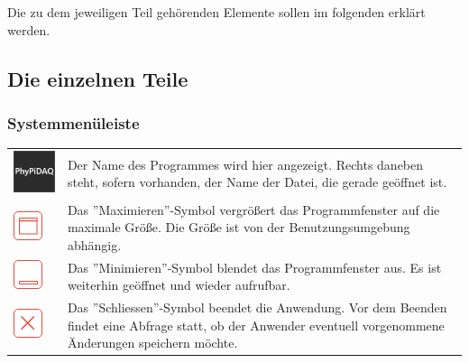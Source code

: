 \documentclass[parskip=full]{scrartcl}
\begin{document}
Die zu dem jeweiligen Teil gehörenden Elemente sollen im folgenden erklärt werden.

\subsection{Die einzelnen Teile}

\subsubsection{Systemmenüleiste}

\begin{tabular}[t]{p{1cm} p{10cm}}
	\vspace{0cm}\includegraphics[width = 1 cm]{Grafik/PhyPiDAQ.png} & Der Name des Programmes wird hier angezeigt. Rechts daneben steht, sofern vorhanden, der Name der Datei, die gerade geöffnet ist.\newline\\
	\vspace{0cm}\includegraphics[width = 1 cm]{Grafik/Maximieren.png} & Das ''Maximieren''-Symbol vergrößert das Programmfenster auf die maximale Größe. Die Größe ist von der Benutzungsumgebung abhängig.\newline\\
	\vspace{0cm}\includegraphics[width = 1 cm]{Grafik/Minimieren.png} & Das ''Minimieren''-Symbol blendet das Programmfenster aus. Es ist weiterhin geöffnet und wieder aufrufbar. \\
	\vspace{0cm}\includegraphics[width = 1 cm]{Grafik/Schliessen.png} & Das ''Schliessen''-Symbol beendet die Anwendung. Vor dem Beenden findet eine Abfrage statt, ob der Anwender eventuell vorgenommene Änderungen speichern möchte.\newline\\
\end{tabular}
\end{document}
